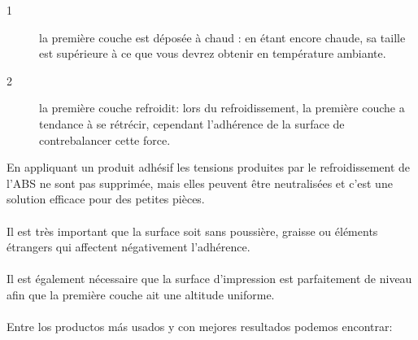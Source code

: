 \documentclass[11pt,a4paper]{article}
\begin{document}
\begin{description}
\item[1] la première couche est déposée à chaud : en étant encore chaude, sa taille est supérieure à ce que vous devrez obtenir en température ambiante.
\item[2] la première couche refroidit: lors du refroidissement, la première couche a tendance à se rétrécir, cependant l’adhérence de la surface de contrebalancer cette force.
\end{description}
En appliquant un produit adhésif les tensions produites par le refroidissement de l’ABS ne sont pas supprimée, mais elles peuvent être neutralisées et c’est une solution efficace pour des petites pièces.
\\\\
Il est très important que la surface soit sans poussière,  graisse ou éléments étrangers qui affectent négativement l’adhérence.
\\\\
Il est également nécessaire que la surface d’impression est parfaitement de niveau afin que la première couche ait une altitude uniforme.
\\\\
Entre los productos más usados y con mejores resultados podemos encontrar:
\end{document}
